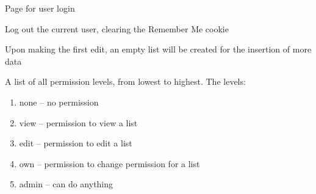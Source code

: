 \documentclass[letterpaper,10pt,english]{sphinxmanual}
\begin{document}

\begin{fulllineitems}
\label{index:routes.login}
Page for user login

\end{fulllineitems}


\begin{fulllineitems}
\label{index:routes.logout}
Log out the current user, clearing the Remember Me cookie

\end{fulllineitems}


\begin{fulllineitems}
\label{index:routes.make_list}
Upon making the first edit, an empty list will be
created for the insertion of more data

\end{fulllineitems}


\begin{fulllineitems}
\label{index:routes.perm_list}
A list of all permission levels, from lowest to highest.
The levels:
\begin{enumerate}
\item {} 
none  -- no permission

\item {} 
view  -- permission to view a list

\item {} 
edit  -- permission to edit a list

\item {} 
own   -- permission to change permission for a list

\item {} 
admin -- can do anything

\end{enumerate}

\end{fulllineitems}

\end{document}
